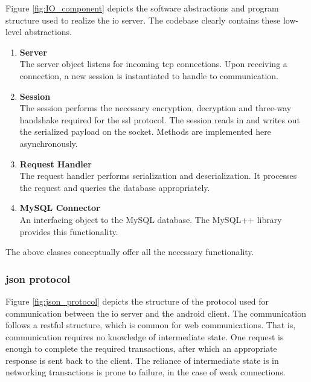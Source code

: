 Figure \ref{fig:IO_component} depicts the software abstractions and program structure used to realize the \ac{io} server.
The codebase clearly contains these low-level abstractions.
\begin{enumerate}
\item \textbf{Server}\\
The server object listens for incoming \ac{tcp} connections.
Upon receiving a connection, a new session is instantiated to handle to communication.
\item \textbf{Session}\\
The session performs the necessary encryption, decryption and three-way handshake required for the \ac{ssl} protocol.
The session reads in and writes out the serialized payload on the socket.
Methods are implemented here asynchronously.
\item \textbf{Request Handler}\\
The request handler performs serialization and deserialization.
It processes the request and queries the database appropriately.
\item \textbf{MySQL Connector}\\
An interfacing object to the MySQL database. The MySQL++ library provides this functionality.
\end{enumerate}
The above classes conceptually offer all the necessary functionality.

\pagebreak
\subsubsection{\ac{json} protocol}
Figure \ref{fig:json_protocol} depicts the structure of the protocol used for communication between the \ac{io} server and the android client.
The communication follows a \ac{rest}ful structure, which is common for web communications.
That is, communication requires no knowledge of intermediate state.
One request is enough to complete the required transactions, after which an appropriate response is sent back to the client.
The reliance of intermediate state is in networking transactions is prone to failure, in the case of weak connections.

